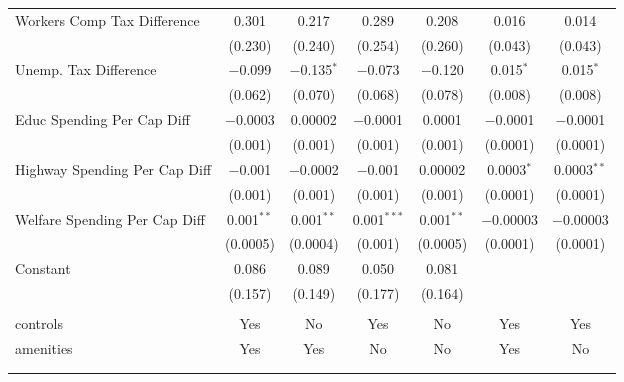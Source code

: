 \begin{table}[!htbp]
\begin{tabular}{@{\extracolsep{5pt}}lcccccc}
  Workers Comp Tax Difference & 0.301 & 0.217 & 0.289 & 0.208 & 0.016 & 0.014 \\ 
  & (0.230) & (0.240) & (0.254) & (0.260) & (0.043) & (0.043) \\ 
  Unemp. Tax Difference & $-$0.099 & $-$0.135$^{*}$ & $-$0.073 & $-$0.120 & 0.015$^{*}$ & 0.015$^{*}$ \\ 
  & (0.062) & (0.070) & (0.068) & (0.078) & (0.008) & (0.008) \\ 
  Educ Spending Per Cap Diff & $-$0.0003 & 0.00002 & $-$0.0001 & 0.0001 & $-$0.0001 & $-$0.0001 \\ 
  & (0.001) & (0.001) & (0.001) & (0.001) & (0.0001) & (0.0001) \\ 
  Highway Spending Per Cap Diff & $-$0.001 & $-$0.0002 & $-$0.001 & 0.00002 & 0.0003$^{*}$ & 0.0003$^{**}$ \\ 
  & (0.001) & (0.001) & (0.001) & (0.001) & (0.0001) & (0.0001) \\ 
  Welfare Spending Per Cap Diff & 0.001$^{**}$ & 0.001$^{**}$ & 0.001$^{***}$ & 0.001$^{**}$ & $-$0.00003 & $-$0.00003 \\ 
  & (0.0005) & (0.0004) & (0.001) & (0.0005) & (0.0001) & (0.0001) \\ 
  Constant & 0.086 & 0.089 & 0.050 & 0.081 &  &  \\ 
  & (0.157) & (0.149) & (0.177) & (0.164) &  &  \\ 
 \hline \\[-1.8ex] 
controls & Yes & No & Yes & No & Yes & Yes \\ 
amenities & Yes & Yes & No & No & Yes & No \\ 
\hline \\[-1.8ex] 
\hline 
\hline \\[-1.8ex] 
\end{tabular} 
\end{table} 
